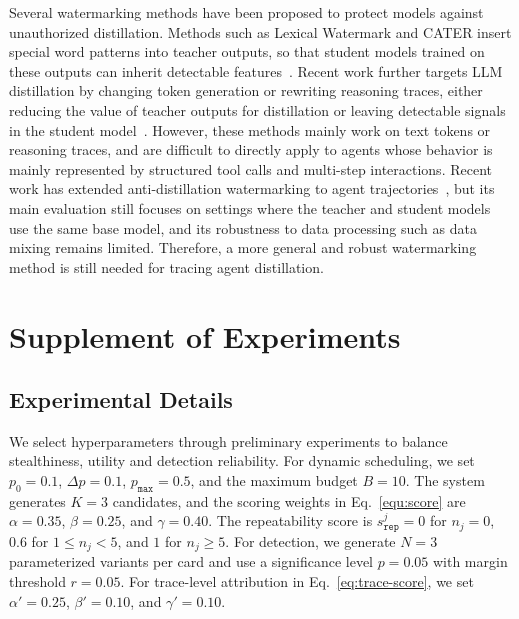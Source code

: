 Several watermarking methods have been proposed to protect models against unauthorized distillation. Methods such as Lexical Watermark and CATER insert special word patterns into teacher outputs, so that student models trained on these outputs can inherit detectable features~\cite{he2022protecting, he2022cater, yang2026asking}. Recent work further targets LLM distillation by changing token generation or rewriting reasoning traces, either reducing the value of teacher outputs for distillation or leaving detectable signals in the student model~\cite{savani2026antidistillation, xu2026antidistillation, ma2026protecting}. However, these methods mainly work on text tokens or reasoning traces, and are difficult to directly apply to agents whose behavior is mainly represented by structured tool calls and multi-step interactions. Recent work has extended anti-distillation watermarking to agent trajectories~\cite{wang2026protecting}, but its main evaluation still focuses on settings where the teacher and student models use the same base model, and its robustness to data processing such as data mixing remains limited. Therefore, a more general and robust watermarking method is still needed for tracing agent distillation.




\section{Supplement of Experiments}


\subsection{Experimental Details}
\label{sec:experimental-details}

 We select \name{} hyperparameters through preliminary experiments to balance stealthiness, utility and detection reliability. For dynamic scheduling, we set $p_0 = 0.1$, $\Delta p = 0.1$, $p_{\mathtt{max}} = 0.5$, and the maximum budget $B = 10$. The system generates $K = 3$ candidates, and the scoring weights in Eq.~\ref{equ:score} are $\alpha = 0.35$, $\beta = 0.25$, and $\gamma = 0.40$. The repeatability score is $s_{\mathtt{rep}}^j=0$ for $n_j=0$, $0.6$ for $1\leq n_j<5$, and $1$ for $n_j\geq5$. For detection, we generate $N = 3$ parameterized variants per card and use a significance level $p=0.05$ with margin threshold $r=0.05$. For trace-level attribution in Eq.~\ref{eq:trace-score}, we set $\alpha' = 0.25$, $\beta' = 0.10$, and $\gamma' = 0.10$.



